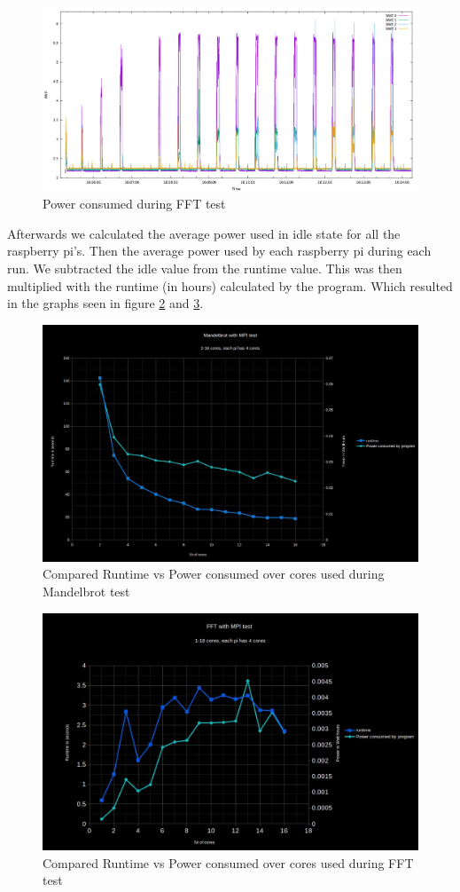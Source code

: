\documentclass{article}
\begin{document}
\begin{figure}[H]
\centering
\includegraphics[width=12cm]{images/wattage.png}
\caption{Power consumed during FFT test}
\label{fig:FFTgnuplot}
\end{figure}

Afterwards we calculated the average power used in idle state for all the raspberry pi's. Then the average power used by each raspberry pi during each run. We subtracted the idle value from the runtime value. This was then multiplied with the runtime (in hours) calculated by the program. Which resulted in the graphs seen in figure \ref{fig:Mandelgraph} and \ref{fig:FFTgraph}.

\begin{figure}[H]
\centering
\includegraphics[width=12cm]{images/Mandelbrot.png}
\caption{Compared Runtime vs Power consumed over cores used during Mandelbrot test}
\label{fig:Mandelgraph}
\end{figure}

\begin{figure}[H]
\centering
\includegraphics[width=12cm]{images/FFTMPI.png}
\caption{Compared Runtime vs Power consumed over cores used during FFT test}
\label{fig:FFTgraph}
\end{figure}
\end{document}
